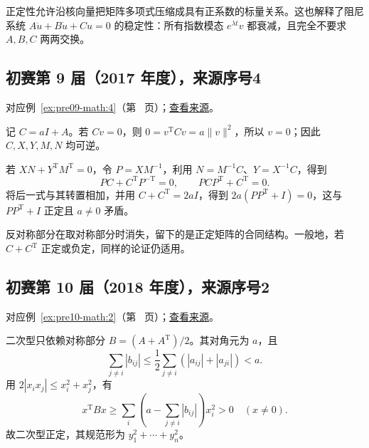 \documentclass[UTF8,12pt,a4paper,fontset=fandol]{ctexart}
\begin{document}
\begin{remark}[方法与条件]

正定性允许沿核向量把矩阵多项式压缩成具有正系数的标量关系。这也解释了阻尼系统 $A\ddot u+B\dot u+Cu=0$ 的稳定性：所有指数模态 $e^{\lambda t}v$ 都衰减，且完全不要求 $A,B,C$ 两两交换。

\end{remark}

\subsection{初赛第 9 届（2017 年度），来源序号4}\label{ans:pre09-math:4}\label{pr:pre09-math:4}

对应例~\ref{ex:pre09-math:4}（第~\pageref{ex:pre09-math:4} 页）；\href{https://github.com/lzxcr/cmc-mathematics/blob/64916fa1fdbc3e444a652eca204d5669058ee321/src/problems/preliminary/09/04.md}{查看来源}。

\begin{solve}

记 $C=aI+A$。若 $Cv=0$，则 $0=v^{\mathrm T}Cv=a\|v\|^2$，所以 $v=0$；因此 $C,X,Y,M,N$ 均可逆。

若 $XN+Y^{\mathrm T}M^{\mathrm T}=0$，令 $P=XM^{-1}$，利用 $N=M^{-1}C$、$Y=X^{-1}C$，得到
\[
PC+C^{\mathrm T}P^{-\mathrm T}=0,
\qquad PCP^{\mathrm T}+C^{\mathrm T}=0.
\]
将后一式与其转置相加，并用 $C+C^{\mathrm T}=2aI$，得到 $2a(PP^{\mathrm T}+I)=0$，这与 $PP^{\mathrm T}+I$ 正定且 $a\ne0$ 矛盾。

\end{solve}

\begin{remark}[方法与条件]

反对称部分在取对称部分时消失，留下的是正定矩阵的合同结构。一般地，若 $C+C^{\mathrm T}$ 正定或负定，同样的论证仍适用。

\end{remark}

\subsection{初赛第 10 届（2018 年度），来源序号2}\label{ans:pre10-math:2}\label{pr:pre10-math:2}

对应例~\ref{ex:pre10-math:2}（第~\pageref{ex:pre10-math:2} 页）；\href{https://github.com/lzxcr/cmc-mathematics/blob/64916fa1fdbc3e444a652eca204d5669058ee321/src/problems/preliminary/10/02.md}{查看来源}。

\begin{solve}

二次型只依赖对称部分 $B=(A+A^{\mathrm T})/2$。其对角元为 $a$，且
\[
\sum_{j\ne i}|b_{ij}|
\le\frac12\sum_{j\ne i}(|a_{ij}|+|a_{ji}|)<a.
\]
用 $2|x_ix_j|\le x_i^2+x_j^2$，有
\[
x^{\mathrm T}Bx\ge\sum_i\left(a-\sum_{j\ne i}|b_{ij}|\right)x_i^2>0
\quad(x\ne0).
\]
故二次型正定，其规范形为 $\boxed{y_1^2+\cdots+y_n^2}$。

\end{solve}
\end{document}
